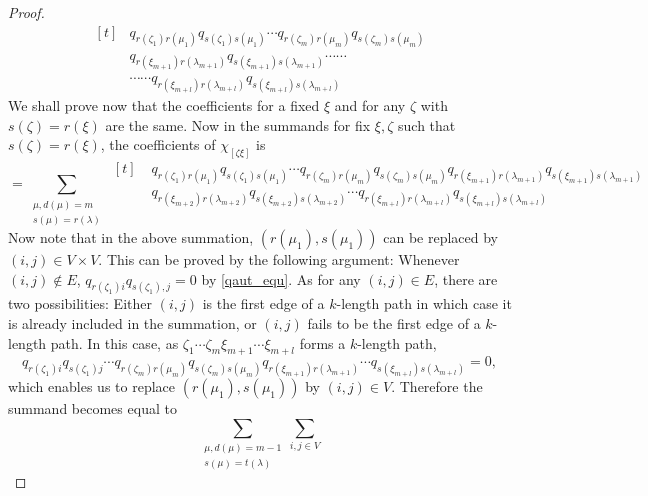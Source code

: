 \documentclass{amsart}
\theoremstyle{plain}
\theoremstyle{definition}
\theoremstyle{remark}
\numberwithin{equation}{section}
\begin{document}
\begin{proof}
\begin{equation*}
    \begin{aligned}[t]
        &q_{r(\zeta_{1})r(\mu_{1})}q_{s(\zeta_{1})s(\mu_{1})}\cdots q_{r(\zeta_{m})r(\mu_{m})}q_{s(\zeta_{m})s(\mu_{m})}\\
        &q_{r(\xi_{m+1})r(\lambda_{m+1})}q_{s(\xi_{m+1})s(\lambda_{m+1})}\cdots\cdots\\
        &\cdots\cdots q_{r(\xi_{m+l})r(\lambda_{m+l})}q_{s(\xi_{m+l})s(\lambda_{m+l})}
    \end{aligned}
\end{equation*}
We shall prove now that the coefficients for a fixed $\xi$ and for any $\zeta$ with $s(\zeta)=r(\xi)$ are the  same. Now in the summands for fix $\xi,\zeta$ such that $s(\zeta)=r(\xi)$, the coefficients of $\chi_{[\zeta\xi]}$ is
\begin{equation*}
    =\sum\limits_{\substack{\mu, d(\mu)=m \\ s(\mu)=r(\lambda)}}
    \begin{aligned}[t]
        &\;q_{r(\zeta_{1})r(\mu_{1})}q_{s(\zeta_{1})s(\mu_{1})}\cdots q_{r(\zeta_{m})r(\mu_{m})}q_{s(\zeta_{m})s(\mu_{m})}
q_{r(\xi_{m+1})r(\lambda_{m+1})}q_{s(\xi_{m+1})s(\lambda_{m+1})}\\
&\; q_{r(\xi_{m+2})r(\lambda_{m+2})}q_{s(\xi_{m+2})s(\lambda_{m+2})} \cdots q_{r(\xi_{m+l})r(\lambda_{m+l})}q_{s(\xi_{m+l})s(\lambda_{m+l})}
    \end{aligned}
\end{equation*}
Now note that in the above summation, $(r(\mu_{1}),s(\mu_{1}))$ can be replaced by $(i,j)\in V\times V$. This can be proved by the following argument: Whenever $(i,j)\notin E$, $q_{r(\zeta_{1})i}q_{s(\zeta_{1}),j}=0$ by \ref{qaut_equ}. As for any $(i,j)\in E$, there are two possibilities: Either $(i,j)$ is the first edge of a $k$-length path in which case it is already included in the summation, or $(i,j)$ fails to be the first edge of a $k$-length path. In this case, as $\zeta_{1}\cdots\zeta_{m}\xi_{m+1}\cdots\xi_{m+l}$ forms a $k$-length path,
\begin{displaymath}
    q_{r(\zeta_{1})i}q_{s(\zeta_{1})j}\cdots q_{r(\zeta_{m})r(\mu_{m})}q_{s(\zeta_{m})s(\mu_{m})}
q_{r(\xi_{m+1})r(\lambda_{m+1})}\cdots q_{s(\xi_{m+l})s(\lambda_{m+l})}=0,
\end{displaymath} which enables us to replace $(r(\mu_{1}),s(\mu_{1}))$ by $(i,j)\in V$. Therefore the summand becomes equal to
\begin{equation*}
    \sum\limits_{\substack{\mu, d(\mu)=m-1 \\ s(\mu)=t(\lambda)}}\sum\limits_{i,j\in V}

\end{equation*}
\end{proof}
\end{document}
